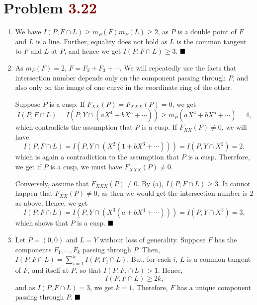 \documentclass[12pt]{article}
\begin{document}
\section{Problem \textcolor{maroon}{3.22}}
\begin{enumerate}[label = (\alph*)]
    \item We have \( I(P, F \cap L) \geq m_P(F)m_P(L) \geq 2 \), as \( P \) is a double point of \( F \) and \( L \) is a line. Further, equality does not hold as \( L \) is the common tangent to \( F \) and \( L \) at \( P \), and hence we get \( I(P,F \cap L) \geq 3 \). \(\hfill \blacksquare\)
          \smallskip

    \item As \( m_P(F)=2 \), \( F = F_2 + F_3 + \cdots \). We will repeatedly use the facts that intersection number depends only on the component passing through \( P \), and also only on the image of one curve in the coordinate ring of the other.

          Suppose \( P \) is a cusp. If \( F_{XX}(P) = F_{XXX}(P) = 0 \), we get
          \[
              I(P, F \cap L) = I(P, Y \cap (aX^4 + bX^5 + \cdots)) \geq m_P(aX^4 + bX^5 + \cdots) = 4,
          \]
          which contradicts the assumption that \( P \) is a cusp. If \( F_{XX}(P) \neq 0 \), we will have
          \[
              I(P, F \cap L) = I(P, Y \cap (X^2(1+bX^3+\cdots))) = I(P, Y \cap X^2) = 2,
          \]
          which is again a contradiction to the assumption that \( P \) is a cusp. Therefore, we get if \( P \) is a cusp, we must have \( F_{XXX}(P) \neq 0 \).

          Conversely, assume that \( F_{XXX}(P) \neq 0 \). By (a), \( I(P, F \cap L) \geq 3 \). It cannot happen that \( F_{XX}(P) \neq 0 \), as then we would get the intersection number is 2 as above. Hence, we get
          \[
              I(P, F \cap L) = I(P, Y \cap (X^3(a+bX^4+\cdots))) = I(P, Y \cap X^3) = 3,
          \]
          which shows that \( P \) is a cusp. \(\hfill \blacksquare\)
          \smallskip

    \item Let \( P = (0,0) \) and \( L = Y \) without loss of generality. Suppose \( F \) has the components \( F_1, \dots, F_k \) passing through \( P \). Then, \( I(P, F \cap L) = \sum_{i=1}^{k}I(P, F_i \cap L) \). But, for each \( i \), \( L \) is a common tangent of \( F_i \) and itself at \( P \), so that \( I(P, F_i \cap L) > 1 \). Hence,
          \[
              I(P, F \cap L) \geq 2k,
          \]
          and as \( I(P, F \cap L) = 3 \), we get \( k = 1 \). Therefore, \( F \) has a unique component passing through \( P \). \(\hfill \blacksquare\)
\end{enumerate}
\end{document}
